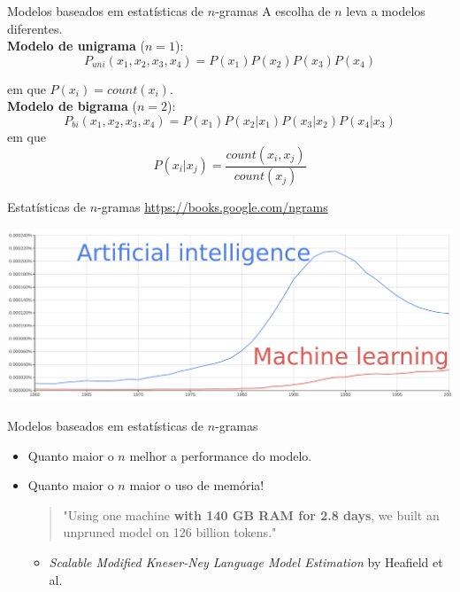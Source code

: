 \documentclass[10pt]{beamer}
\begin{document}
\begin{frame}{Modelos baseados em estatísticas de $n$-gramas}
A escolha de $n$ leva a modelos diferentes.\\

\textbf{Modelo de unigrama} ($n=1$): 
\begin{equation*}
P_{uni}(x_1, x_2, x_3, x_4) = P(x_1)P(x_2)P(x_3)P(x_4)
\end{equation*}

em que $P(x_i) = count(x_i)$.\\

\textbf{Modelo de bigrama} ($n=2$): 
\begin{equation*}
P_{bi}(x_1,x_2,x_3,x_4) = P(x_1)P(x_2\vert x_1)P(x_3\vert x_2)P(x_4\vert x_3)
\end{equation*} 
em que
\[
P(x_i\vert x_j) = \frac{count(x_i, x_j)}{count(x_j)}
\]
\end{frame}

\begin{frame}{Estatísticas de $n$-gramas}
\url{https://books.google.com/ngrams}
\vspace{0.4cm}

\includegraphics[scale=0.14]{images/AI_ML.png}
\end{frame}



\begin{frame}{Modelos baseados em estatísticas de $n$-gramas}
\begin{itemize}
\item Quanto maior o $n$ melhor a performance do modelo.
\vspace{0.7cm}
\item Quanto maior o $n$ maior o uso de memória!
\vspace{0.1cm}
\begin{quote}
"Using one machine \textbf{with 140 GB
RAM for 2.8 days}, we built an unpruned
model on 126 billion tokens."
\end{quote}
\begin{itemize}
\item [] \textit{Scalable Modified Kneser-Ney Language Model Estimation} by Heafield et al.
\end{itemize}
\end{itemize}
\end{frame}
\end{document}
